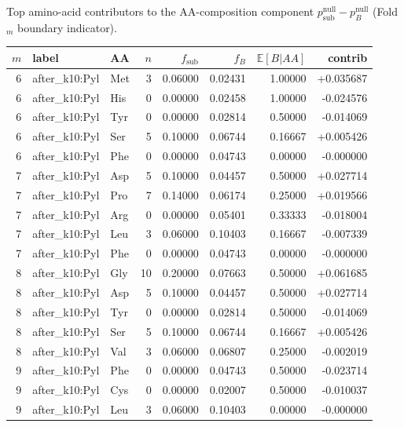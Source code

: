 Top amino-acid contributors to the AA-composition component $p^{\mathrm{null}}_{\mathrm{sub}}-p^{\mathrm{null}}_B$ (Fold$_m$ boundary indicator).

\begingroup
{}
\scriptsize
\setlength{\tabcolsep}{4pt}
\renewcommand{\arraystretch}{1.10}
\setlength{\LTleft}{0pt}
\setlength{\LTright}{0pt}
\begin{longtable}{r l l r r r r r}
\toprule
$m$ & label & AA & $n$ & $f_{\mathrm{sub}}$ & $f_B$ & $\mathbb{E}[B|AA]$ & contrib \\
\midrule
6 & after\_k10:Pyl & Met & 3 & 0.06000 & 0.02431 & 1.00000 & +0.035687 \\
6 & after\_k10:Pyl & His & 0 & 0.00000 & 0.02458 & 1.00000 & -0.024576 \\
6 & after\_k10:Pyl & Tyr & 0 & 0.00000 & 0.02814 & 0.50000 & -0.014069 \\
6 & after\_k10:Pyl & Ser & 5 & 0.10000 & 0.06744 & 0.16667 & +0.005426 \\
6 & after\_k10:Pyl & Phe & 0 & 0.00000 & 0.04743 & 0.00000 & -0.000000 \\
7 & after\_k10:Pyl & Asp & 5 & 0.10000 & 0.04457 & 0.50000 & +0.027714 \\
7 & after\_k10:Pyl & Pro & 7 & 0.14000 & 0.06174 & 0.25000 & +0.019566 \\
7 & after\_k10:Pyl & Arg & 0 & 0.00000 & 0.05401 & 0.33333 & -0.018004 \\
7 & after\_k10:Pyl & Leu & 3 & 0.06000 & 0.10403 & 0.16667 & -0.007339 \\
7 & after\_k10:Pyl & Phe & 0 & 0.00000 & 0.04743 & 0.00000 & -0.000000 \\
8 & after\_k10:Pyl & Gly & 10 & 0.20000 & 0.07663 & 0.50000 & +0.061685 \\
8 & after\_k10:Pyl & Asp & 5 & 0.10000 & 0.04457 & 0.50000 & +0.027714 \\
8 & after\_k10:Pyl & Tyr & 0 & 0.00000 & 0.02814 & 0.50000 & -0.014069 \\
8 & after\_k10:Pyl & Ser & 5 & 0.10000 & 0.06744 & 0.16667 & +0.005426 \\
8 & after\_k10:Pyl & Val & 3 & 0.06000 & 0.06807 & 0.25000 & -0.002019 \\
9 & after\_k10:Pyl & Phe & 0 & 0.00000 & 0.04743 & 0.50000 & -0.023714 \\
9 & after\_k10:Pyl & Cys & 0 & 0.00000 & 0.02007 & 0.50000 & -0.010037 \\
9 & after\_k10:Pyl & Leu & 3 & 0.06000 & 0.10403 & 0.00000 & -0.000000 \\

\end{longtable}
